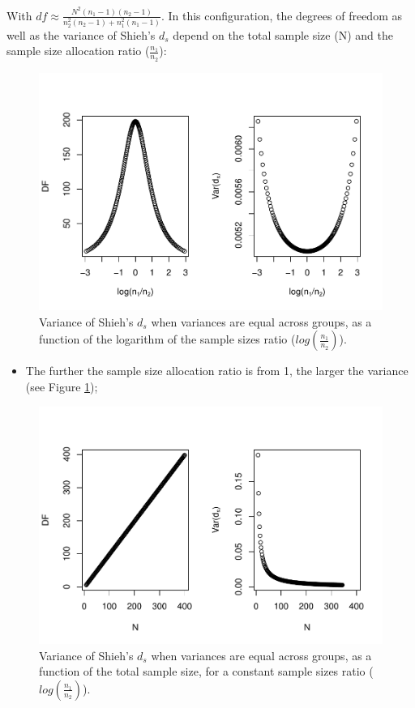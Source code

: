\documentclass[
  man]{apa6}
\providecommand{\tightlist}{%
  \setlength{\itemsep}{0pt}\setlength{\parskip}{0pt}}
\begin{document}
With \(df \approx \frac{N^2(n_1-1)(n_2-1)}{n_2^2(n_2-1)+n_1^2(n_1-1)}\). In this configuration, the degrees of freedom as well as the variance of Shieh's \(d_s\) depend on the total sample size (N) and the sample size allocation ratio (\(\frac{n_1}{n_2}\)):

\begin{figure}
\centering
\includegraphics{Theoretical-Variance-of-all-estimators-as-a-function-of-population-parameters_files/figure-latex/varshiehHomNratio2-1.pdf}
\caption{\label{fig:varshiehHomNratio2}Variance of Shieh's \(d_s\) when variances are equal across groups, as a function of the logarithm of the sample sizes ratio (\(log\left(\frac{n_1}{n_2} \right)\)).}
\end{figure}

\begin{itemize}
\tightlist
\item
  The further the sample size allocation ratio is from 1, the larger the variance (see Figure \ref{fig:varshiehHomNratio2});
\end{itemize}

\begin{figure}
\centering
\includegraphics{Theoretical-Variance-of-all-estimators-as-a-function-of-population-parameters_files/figure-latex/varshiehhomNsize2-1.pdf}
\caption{\label{fig:varshiehhomNsize2}Variance of Shieh's \(d_s\) when variances are equal across groups, as a function of the total sample size, for a constant sample sizes ratio (\(log\left(\frac{n_1}{n_2} \right)\)).}
\end{figure}
\end{document}
